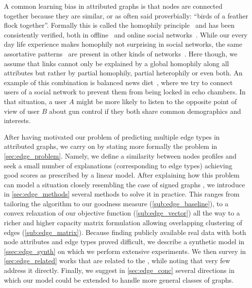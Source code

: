 A common learning bias in attributed graphs is
that nodes are connected together because they are similar, or as often said proverbially:
\enquote{birds of a feather flock together}. Formally this is called the homophily
principle~\autocite{Homophily01} and has been consistently verified, both in
offline~\autocites{homoAttitude78}{homoEdu85} and online social
networks~\autocites{homoSN09}{homoSN12}. While our every day life experience makes homophily not
surprising in social networks, the same assortative patterns~\autocite{AssortativeMixing02} are
present in other kinds of networks~\autocite{AssortativeMixing09}. Here though, we assume that links
cannot only be explained by a global homophily along all attributes but rather by partial homophily,
partial heterophily or even both. An example of this combination is balanced news
diet~\autocite{balancedNews17}, where we try to connect users of a social network to prevent them
from being locked in echo chambers. In that situation, a user $A$ might be more likely to listen to
the opposite point of view of user $B$ about gun control if they both share common demographics and
interests.

After having motivated our problem of predicting multiple edge types in attributed graphs, we carry
on by stating more formally the \ecp{} problem in \autoref{sec:edge_problem}. Namely, we define a
similarity between nodes profiles and seek a small number of explanations (corresponding to edge
types) achieving good scores as prescribed by a linear model. After explaining how this problem can
model a situation closely resembling the case of signed graphs
, we introduce in \autoref{sec:edge_methods} several
methods to solve it in practice. This ranges from tailoring the \kmeans{} algorithm to our goodness
measure (\autoref{sub:edge_baseline}), to a convex relaxation of our objective function
(\autoref{sub:edge_vector}) all the way to a richer and higher capacity matrix formulation allowing
overlapping clustering of edges (\autoref{sub:edge_matrix}). Because finding publicly available real
data with both node attributes and edge types proved difficult, we describe a synthetic model in
\autoref{ssec:edge_synth} on which we perform extensive experiments. We then survey in
\autoref{sec:edge_related} works that are related to the \ecp{}, while noting that very few address
it directly. Finally, we suggest in \autoref{sec:edge_conc} several directions in which our model
could be extended to handle more general classes of graphs.
